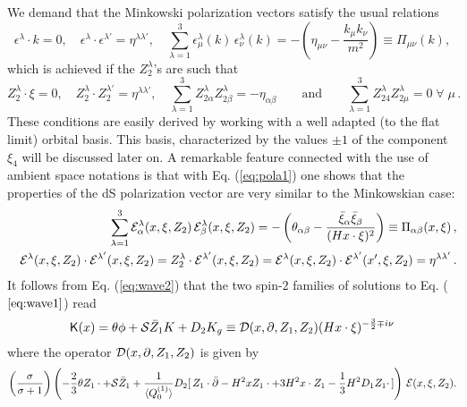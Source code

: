 \documentclass[a4paper,11pt,showpacs,preprintnumbers]{revtex4}
\def\K{\textsf{K}}
\begin{document}
We demand that the Minkowski polarization  vectors satisfy the
usual relations
\begin{equation}
\epsilon^{\lambda}\cdot
k=0,\quad\epsilon^{\lambda}\cdot\epsilon^{\lambda'}=\eta^{\lambda\lambda'}
,\quad\sum_{\lambda=1}^{3}\epsilon_{\mu}^{\lambda}(k)\,\epsilon_{\nu}^{\lambda}(k)=-\left(\eta_{\mu\nu}-\frac{
k_{\mu}k_{\nu}}{m^{2}}\right)\equiv \Pi_{\mu\nu}(k),
\end{equation}
which is achieved if the $Z_2^{\lambda}$'s are such that
\begin{equation}\label{eq:pola1}
Z_{2}^{\lambda}\cdot\xi=0,\quad Z_{2}^{\lambda}\cdot
Z_{2}^{\lambda'}=\eta^{\lambda\lambda'},\quad\sum_{\lambda=1}^{3}Z^{\lambda}_{2\alpha}Z^{\lambda}_{2\beta}
=-\eta_{\alpha\beta}\qquad\mbox{and}\qquad
\sum_{\lambda=1}^{3}Z^{\lambda}_{24}Z^{\lambda}_{2\mu}=0\;\forall\;\mu\,.
\end{equation}
These conditions are easily derived by working with a well adapted
(to the flat limit) orbital basis. This basis, characterized by
the values $\pm 1$ of the component $\xi_{4}$ will be discussed
later on. A remarkable feature connected with the use of ambient
space notations is that with Eq. (\ref{eq:pola1}) one shows that
the properties of the dS polarization vector are very similar to
the Minkowskian case:
\begin{eqnarray}\label{eq:pola2}
&&\sum_{\lambda=1}^{3}{\cal E
}^{\lambda}_{\alpha}(x,\xi,Z_2)\,{\cal E
}^{\lambda}_{\beta}(x,\xi,Z_2)=-\left(\theta_{\alpha\beta}-\frac{\bar\xi_{\alpha}
\bar\xi_{\beta}}{(Hx\cdot\xi)^2}\right)\equiv \Pi_{\alpha\beta}(x,\xi)\,,\nonumber\\
&&{\cal E }^{\lambda}(x,\xi,Z_2)\cdot{\cal E
}^{\lambda'}(x,\xi,Z_2)=Z^{\lambda}_{2}\cdot{\cal E
}^{\lambda'}(x,\xi,Z_2)={\cal E }^{\lambda}(x,\xi,Z_2)\cdot{\cal E
}^{\lambda'}(x',\xi,Z_2)=\eta^{\lambda\lambda'} \,.
\end{eqnarray}
It follows from Eq. (\ref{eq:wave2}) that the two spin-$2$
families of solutions to Eq. ($\ref{eq:wave1}$) read
$$\K(x)=\theta\phi+{\cal S}\bar Z_1K+D_2K_g \equiv {\cal
D}(x,\partial,Z_1,Z_2)(Hx\cdot\xi)^{-\frac{3}{2} \mp i\nu}$$ where
the operator ${\cal D}(x,\partial,Z_1,Z_2)$ is given by
\begin{equation}
\left(\frac{\sigma}{\sigma+1}\right)\left(-\frac{2}{3}\theta
Z_1\cdot+{\cal S} \bar Z_1+\frac{1}{\langle Q_{0}^{(1)}
\rangle}D_2[\,Z_1\cdot\bar\partial-H^2xZ_1\cdot+3H^2 x\cdot Z_1
-\frac{1}{3}H^2 D_1 Z_1\cdot\, ]\right) \,{\cal E}(x,\xi,Z_2).
\label{eq:pro}
\end{equation}
\end{document}
